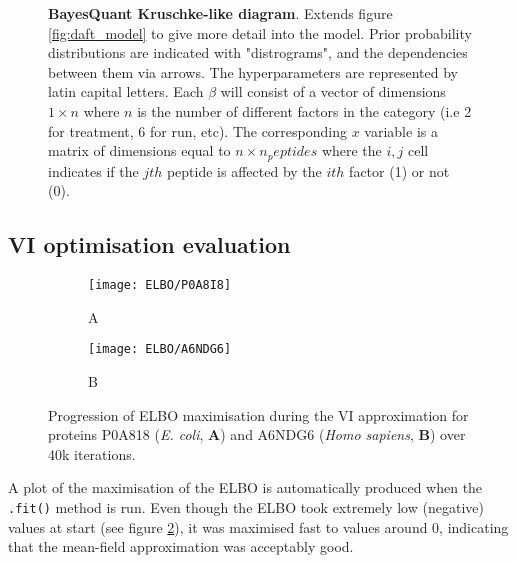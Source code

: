 \begin{figure}[!h]

\caption[BayesQuant Kruschke-like diagram]{\textbf{BayesQuant Kruschke-like diagram}. Extends figure \ref{fig:daft_model} to give more detail into the model. Prior probability distributions are indicated with "distrograms", and the dependencies between them via arrows. The hyperparameters are represented by latin capital letters. Each $\beta$ will consist of a vector of dimensions $1 \times n$ where $n$ is the number of different factors in the category (i.e 2 for treatment, 6 for run, etc). The corresponding $x$ variable is a matrix of dimensions equal to $n \times n_peptides$ where the $i,j$ cell indicates if the $jth$ peptide is affected by the $ith$ factor (1) or not (0).}
\label{fig:dbda}
\end{figure}

\subsection{VI optimisation evaluation}


\begin{figure}[H]
\begin{subfigure}{.45\textwidth}
\centering
\caption*{A}
\texttt{[image: ELBO/P0A8I8]}
\end{subfigure}
\begin{subfigure}{.45\textwidth}
\centering
\caption*{B}
\texttt{[image: ELBO/A6NDG6]}
\end{subfigure}
\caption[ELBO progression]{Progression of \ac{ELBO} maximisation during the \ac{VI} approximation for proteins P0A818 (\textit{E. coli}, \textbf{A}) and A6NDG6 (\textit{Homo sapiens}, \textbf{B}) over 40k iterations.}
\label{fig:ELBO}
\end{figure}

A plot of the maximisation of the \ac{ELBO} is automatically produced when the \texttt{.fit()} method is run. Even though the ELBO took extremely low (negative) values at start (see figure \ref{fig:ELBO}), it was maximised fast to values around 0, indicating that the mean-field approximation was acceptably good.


